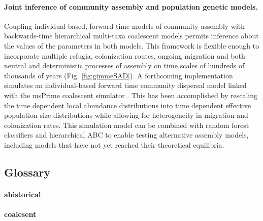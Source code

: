 \documentclass[12pt]{article}
\begin{document}
    \paragraph{Joint inference of community assembly and population
      genetic models.} Coupling individual-based, forward-time models
    of community assembly with backwards-time hierarchical multi-taxa
    coalescent models permits inference about the values of the
    parameters in both models. This framework is flexible enough to
    incorporate multiple refugia, colonization routes, ongoing
    migration and both neutral and deterministic processes of assembly
    on time scales of hundreds of thousands of years
    (Fig. \ref{fig:gimmeSAD}). A forthcoming implementation
    \citep[gimmeSAD$\pi$;][]{overcast} simulates an individual-based
    forward time community dispersal model \citep{Rosindell2015-dk} linked
    with the msPrime coalescent simulator \citep{kelleher2016}. This has
    been accomplished by rescaling the time dependent local abundance
    distributions into time dependent effective population size
    distributions while allowing for heterogeneity in migration and
    colonization rates. This simulation model can be combined with
    random forest classifiers and hierarchical ABC to enable testing
    alternative assembly models, including models that have not yet
    reached their theoretical equilibria.



\subsection*{Glossary}

    

\paragraph{ahistorical}

\paragraph{coalesent}
\end{document}
